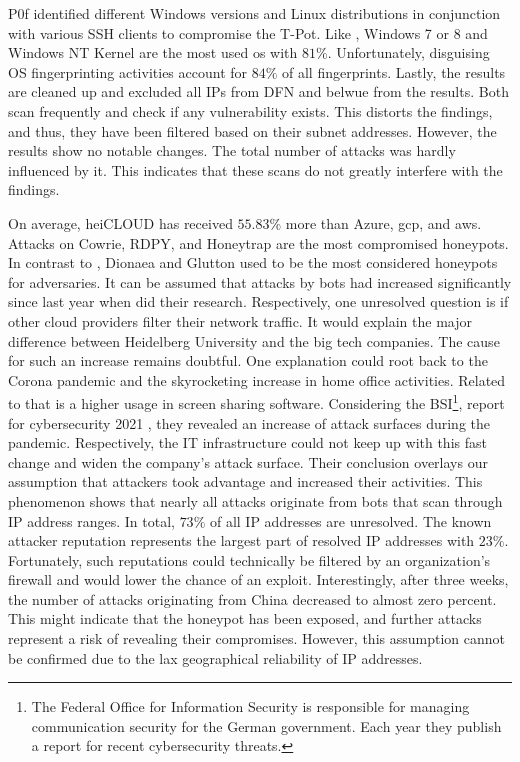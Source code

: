 P0f identified different Windows versions and Linux distributions in conjunction with various SSH clients to compromise the T-Pot.
Like \citet{Kelly2021}, Windows 7 or 8 and Windows NT Kernel are the most used \ac{os} with $81\%$.
Unfortunately, disguising OS fingerprinting activities account for $84\%$ of all fingerprints.
Lastly, the results are cleaned up and excluded all IPs from DFN and \acs{belwue} from the results.
Both scan frequently and check if any vulnerability exists.
This distorts the findings, and thus, they have been filtered based on their subnet addresses.
However, the results show no notable changes.
The total number of attacks was hardly influenced by it.
This indicates that these scans do not greatly interfere with the findings.

On average, heiCLOUD has received $55.83\%$ more than Azure, \ac{gcp}, and \ac{aws}.
Attacks on Cowrie, RDPY, and Honeytrap are the most compromised honeypots.
In contrast to \citet{Kelly2021}, Dionaea and Glutton used to be the most considered honeypots for adversaries.
It can be assumed that attacks by bots had increased significantly since last year when \citet{Kelly2021} did their research.
Respectively, one unresolved question is if other cloud providers filter their network traffic.
It would explain the major difference between Heidelberg University and the big tech companies.
The cause for such an increase remains doubtful.
One explanation could root back to the Corona pandemic and the skyrocketing increase in home office activities.
Related to that is a higher usage in screen sharing software.
Considering the BSI\footnote{The Federal Office for Information Security is responsible for managing communication security for the German government.
Each year they publish a report for recent cybersecurity threats.}, report for cybersecurity 2021 \cite{bsi2021}, they revealed an increase of attack surfaces during the pandemic.
Respectively, the IT infrastructure could not keep up with this fast change and widen the company's attack surface.
Their conclusion overlays our assumption that attackers took advantage and increased their activities.
This phenomenon shows that nearly all attacks originate from bots that scan through IP address ranges.
In total, $73\%$ of all IP addresses are unresolved.
The known attacker reputation represents the largest part of resolved IP addresses with $23\%$.
Fortunately, such reputations could technically be filtered by an organization's firewall and would lower the chance of an exploit.
Interestingly, after three weeks, the number of attacks originating from China decreased to almost zero percent.
This might indicate that the honeypot has been exposed, and further attacks represent a risk of revealing their compromises.
However, this assumption cannot be confirmed due to the lax geographical reliability of IP addresses.

